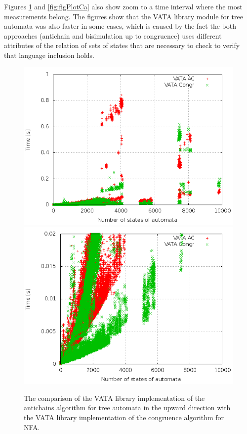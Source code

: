Figures \ref{fig:figPlotAc} and \ref{fig:figPlotCa} also show
zoom to a time interval where the most measurements belong. The figures show that the VATA library module for tree automata was
also faster in some cases, which is caused by the fact the both approaches (antichain and bisimulation up to congruence) uses different attributes of the relation
of sets of states that are necessary to check to verify that language inclusion holds.
\begin{figure}[bt]
\begin{center}
\includegraphics[scale=0.33]{fig/plot_ac_zprava.png}
\includegraphics[scale=0.33]{fig/plot_ac_step_zprava.png}
\caption{The comparison of the VATA library implementation of the antichains algorithm for tree automata in the upward direction
    with the VATA library implementation of the congruence algorithm for NFA.}
\label{fig:figPlotAc}
\end{center}
\end{figure}
